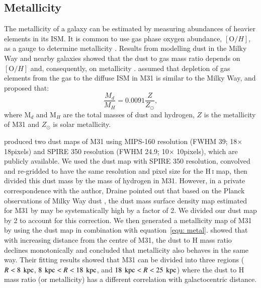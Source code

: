 \subsection{Metallicity}
\label{sec:metal}
 
The metallicity of a galaxy can be estimated by measuring abundances of heavier elements in its ISM. 
It is common to use  gas phase oxygen abundance, $[{\mathrm O/H}]$, as a gauge to determine metallicity \citep[e.g.][]{McGaugh91, Zaritsky94}. 
Results from modelling dust in the Milky Way and nearby galaxies showed that the dust to gas mass ratio depends on $[{\mathrm O/H}]$ and, consequently, on metallicity \citet{Draine07}. \citet{Draine14} assumed that depletion of gas elements from the gas to the diffuse ISM in M31 is similar to the Milky Way, and proposed that: 
 \begin{equation}
 \label{equ: metal}
\frac{M_d}{M_H}=0.0091 \frac{Z}{Z_{\odot}},
 \end{equation} 
\noindent where M$_d$ and M$_H$ are the total masses of dust and hydrogen, $Z$ is the metallicity of M31 and $Z_{\odot}$ is solar metallicity. 

\citet{Draine14} produced two dust maps of M31 using MIPS-160 resolution (FWHM  39\arcsec; 18\arcsec $\times$ 18\arcsec pixels) and SPIRE 350 resolution (FWHM 24\arcsec.9; 10\arcsec $\times$ 10\arcsec pixels), which are publicly available. 
We used the dust map with SPIRE 350 resolution, convolved and re-gridded  to have the same resolution and pixel size for the H\,{\textsc i} map, then divided this dust mass by the mass of hydrogen in M31. 
However, in a private correspondence with the author, Draine pointed out that based on the Planck observations of Milky Way dust \citet{Tauber10}, the dust mass surface density map estimated for M31 by \citet{Draine14} may be systematically high by a factor of 2. We divided our dust map by 2 to account for this correction. 
We then generated a metallicity map of M31 by using the dust map in combination with equation~\ref{equ: metal}. \citet{Draine14} showed that with increasing distance from the centre of M31, the dust to H mass ratio declines monotonically and concluded that metallicity also behaves in the same way. 
Their fitting results showed that M31 can be divided into three regions ($R< 8~\,{\rm kpc}$, $8~\,{\rm kpc} < R < 18~\,{\rm kpc}$, and $18~\,{\rm kpc} < R < 25~\,{\rm kpc}$) where the dust to H mass ratio (or metallicity) has a different correlation with galactocentric distance.
  

